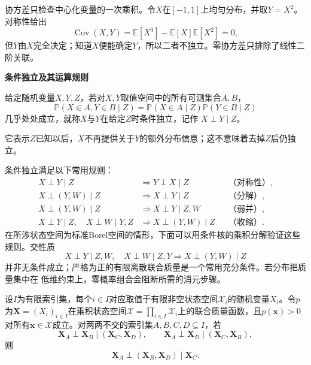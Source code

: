 协方差只检查中心化变量的一次乘积。令\(X\)在\([-1,1]\)上均匀分布，并取\(Y=X^2\)。对称性给出
\[ \operatorname{Cov}(X,Y)
  =\mathbb{E}[X^3]-\mathbb{E}[X]\mathbb{E}[X^2]=0, \]
但\(Y\)由\(X\)完全决定；知道\(X\)便能确定\(Y\)，所以二者不独立。零协方差只排除了线性二阶关联。

\par\medskip\noindent\textbf{条件独立及其运算规则}\quad
\begin{definition}[条件独立]
  \label{def:probability-conditional-independence}
  给定随机变量\(X,Y,Z\)，若对\(X,Y\)取值空间中的所有可测集合\(A,B\)，
\[ \mathbb{P}(X\in A,Y\in B\mid Z)
  =\mathbb{P}(X\in A\mid Z)\mathbb{P}(Y\in B\mid Z) \]
几乎处处成立，就称\(X\)与\(Y\)在给定\(Z\)时条件独立，记作
\(X\perp Y\mid Z\)。
\end{definition}
它表示\(Z\)已知以后，\(X\)不再提供关于\(Y\)的额外分布信息；这不意味着去掉\(Z\)后仍独立。

条件独立满足以下常用规则：
\[
\begin{aligned}
  X\perp Y\mid Z
  &\Longrightarrow Y\perp X\mid Z
  &&\text{（对称性）},\\
  X\perp(Y,W)\mid Z
  &\Longrightarrow X\perp Y\mid Z
  &&\text{（分解）},\\
  X\perp(Y,W)\mid Z
  &\Longrightarrow X\perp Y\mid Z,W
  &&\text{（弱并）},\\
  X\perp Y\mid Z,\quad X\perp W\mid Y,Z
  &\Longrightarrow X\perp(Y,W)\mid Z
  &&\text{（收缩）}.
\end{aligned}
\]
在所涉状态空间为标准Borel空间的情形，下面可以用条件核的乘积分解验证这些规则。交性质
\[ X\perp Y\mid Z,W,\quad
  X\perp W\mid Z,Y\Longrightarrow X\perp(Y,W)\mid Z \]
并非无条件成立；严格为正的有限离散联合质量是一个常用充分条件。若分布把质量集中在
低维约束上，零概率组合会阻断所需的消元步骤。

\begin{lemma}[严格正离散分布的交性质]
  \label{lem:probability-positive-intersection}
  设$I$为有限索引集，每个$i\in I$对应取值于有限非空状态空间$\mathcal{X}_i$的随机变量$X_i$。令$p$为$\bm{X}=(X_i)_{i\in I}$在乘积状态空间$\mathcal{X}=\prod_{i\in I}\mathcal{X}_i$上的联合质量函数，且$p(\bm{x})>0$对所有$\bm{x}\in\mathcal{X}$成立。对两两不交的索引集$A,B,C,D\subseteq I$，若
  \[
    \bm{X}_A\perp\bm{X}_B\mid(\bm{X}_C,\bm{X}_D),
    \qquad
    \bm{X}_A\perp\bm{X}_D\mid(\bm{X}_C,\bm{X}_B),
  \]
  则
  \[
    \bm{X}_A\perp(\bm{X}_B,\bm{X}_D)\mid\bm{X}_C.
  \]
\end{lemma}


